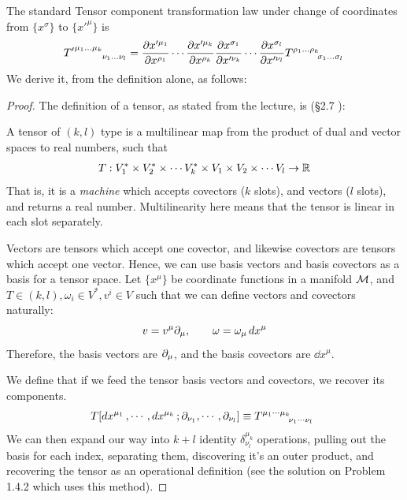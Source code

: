 	\begin{solution_pset}
		The standard Tensor component transformation law under change of 
		coordinates from $\{x^\sigma\}$ to $\{x'^{\mu}\}$ is \cite{juan2026, Liang2023}
		\begin{equation}
			\label{eq:tensor-transformation-law}
			{T'}\indices{^{{\mu_1}\ldots{\mu_k}}_{{\nu_1}\ldots{\nu_l}}}
			=
			\pdv{x'^{\mu_1}}{x^{\rho_1}} 
			\cdots
			\pdv{x'^{\mu_k}}{x^{\rho_k}} 
			\pdv{x^{\sigma_1}}{x'^{\nu_k}} 
			\cdots
			\pdv{x^{\sigma_l}}{x'^{\nu_l}} 
			\tensor{T}{^{{\rho_1}\ldots{\rho_k}}_{{\sigma_1}\ldots{\sigma_l}}}
		\end{equation}
		We derive it, from the definition alone, as follows:

		\begin{proof}
		The definition of a tensor, as stated from the lecture, is (\S 2.7 \cite{juan2026}):

		A tensor of $(k,l)$ type is a multilinear map 
		from the product of dual and vector spaces to real numbers,
		such that
		\begin{equation}
			\label{eq:tensor-defn}
			T:
			V^*_1 \times 
			V^*_2 \times 
			\cdots
			V^*_k \times
			V_1 \times
			V_2 \times
			\cdots
			V_l
			\to \mathbb{R}
		\end{equation}
		That is, it is a \textit{machine} which accepts covectors ($k$ slots), and vectors ($l$ slots),
		and returns a real number. Multilinearity here means that the tensor is linear in each slot separately.

		Vectors are tensors which accept one covector, and likewise covectors are tensors which accept one vector.
		Hence, we can use basis vectors and basis covectors as a basis for a tensor space. Let $\{x^\mu\}$ 
		be coordinate functions in a manifold $\mathcal M$, and 
		$T\in(k,l), \omega_i \in V^*, v^i\in V$
		such that we can define vectors and covectors naturally:
		\[
			v = v^\mu \partial_\mu, \qquad \omega = \omega_\mu \dd{x^\mu}
		\]
		Therefore, the basis vectors are $\partial_\mu$, and the basis covectors are $\dd{x^\mu}$.

		We define that if we feed the tensor basis vectors and covectors, we recover its components.
		\begin{align*}
			T[\dd{x^{\mu_1}},\cdots,\dd{x^{\mu_k}};\p_{\nu_1},\cdots,\p_{\nu_l}]
			\equiv
			T\indices{^{\mu_1\cdots \mu_k}_{\nu_1\cdots\nu_l}}\ 
		\end{align*}
		We can then expand our way into $k+l$ identity $\delta^{\mu_k}_{\nu_l}$ operations,
		pulling out the basis for each index, separating them, discovering it's an outer product,
		and recovering the tensor as an operational
		definition (see the solution on Problem 1.4.2 which uses this method).


\end{proof}
\end{solution_pset}
